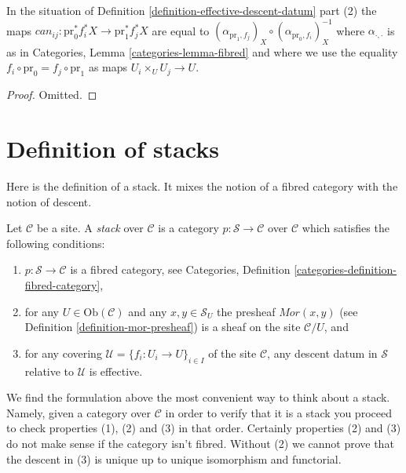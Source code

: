 \begin{lemma}
\label{lemma-trivial-cocycle}
In the situation of
Definition \ref{definition-effective-descent-datum} part (2) the maps
$can_{ij} : \text{pr}_0^*f_i^*X \to \text{pr}_1^*f_j^*X$ are equal to
$(\alpha_{\text{pr}_1, f_j})_X \circ (\alpha_{\text{pr}_0, f_i})_X^{-1}$
where $\alpha_{\cdot, \cdot}$ is as in
Categories, Lemma \ref{categories-lemma-fibred}
and where we
use the equality $f_i \circ \text{pr}_0 = f_j \circ \text{pr}_1$
as maps $U_i \times_U U_j \to U$.
\end{lemma}

\begin{proof}
Omitted.
\end{proof}












\section{Definition of stacks}
\label{section-definition}

\noindent
Here is the definition of a stack. It mixes the notion of a fibred
category with the notion of descent.

\begin{definition}
\label{definition-stack}
Let $\mathcal{C}$ be a site. A {\it stack} over $\mathcal{C}$
is a category $p : \mathcal{S} \to \mathcal{C}$ over $\mathcal{C}$ which
satisfies the following conditions:
\begin{enumerate}
\item $p : \mathcal{S} \to \mathcal{C}$ is a fibred category, see
Categories, Definition \ref{categories-definition-fibred-category},
\item for any $U \in \text{Ob}(\mathcal{C})$ and any $x, y \in \mathcal{S}_U$
the presheaf $\mathit{Mor}(x, y)$ (see
Definition \ref{definition-mor-presheaf}) is a sheaf on
the site $\mathcal{C}/U$, and
\item for any covering $\mathcal{U} = \{f_i : U_i \to U\}_{i \in I}$
of the site $\mathcal{C}$, any descent datum in $\mathcal{S}$
relative to $\mathcal{U}$ is effective.
\end{enumerate}
\end{definition}

\noindent
We find the formulation above the most convenient way to think about
a stack. Namely, given a category over $\mathcal{C}$ in order to verify
that it is a stack you proceed to check properties (1), (2) and
(3) in that order. Certainly properties (2) and (3) do not make sense
if the category isn't fibred. Without (2) we cannot prove that the
descent in (3) is unique up to unique isomorphism and functorial.

